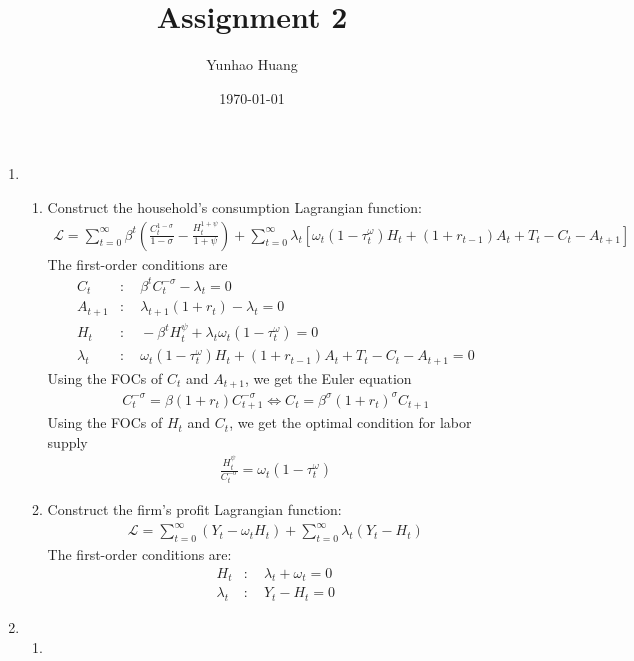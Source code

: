 \documentclass[a4paper,10pt,american]{article}
\begin{document}
\title{Assignment 2}
\author{Yunhao Huang}
\date{\today}

\maketitle

\newcommand\foc[1]{\frac{\partial\mathcal{L}}{\partial{#1}}}


\begin{enumerate}
	\item 
	\begin{enumerate}
		\item 
		Construct the household's consumption Lagrangian function:
		\begin{align*}
		\mathcal{L}=\sum_{t=0}^{\infty} \beta^t \left( \frac{C_t^{1-\sigma}}{1-\sigma}-\frac{H_t^{1+\psi}}{1+\psi}\right) +\sum_{t=0}^{\infty} \lambda_t \left[ {\omega_t(1-\tau_t^\omega)H_t+(1+r_{t-1})A_t+T_t-C_t-A_{t+1}} \right]
		\end{align*}
		The first-order conditions are
		\begin{align*}
			C_t &: \quad \beta^t C_t^{-\sigma} -\lambda_t=0 \\
			A_{t+1} &: \quad \lambda_{t+1}(1+r_t)-\lambda_t=0\\
			H_t &: \quad -\beta^t H_t^\psi +\lambda_t\omega_t(1-\tau_t^\omega)=0\\
			\lambda_t &: \quad \omega_t(1-\tau_t^\omega)H_t+(1+r_{t-1})A_t+T_t-C_t-A_{t+1}=0
		\end{align*}
		Using the FOCs of $C_t$ and $A_{t+1}$, we get the Euler equation
		\begin{align*}
		C_t^{-\sigma}=\beta (1+r_t) C_{t+1}^{-\sigma} \iff C_t=\beta ^\sigma (1+r_t)^\sigma C_{t+1}
		\end{align*}
		Using the FOCs of $H_t$ and $C_t$, we get the optimal condition for labor supply
		\begin{align*}
		\frac{H_t^\psi}{C_t^{-\sigma}}=\omega_t(1-\tau_t^\omega)
		\end{align*}
		
		\item
		Construct the firm's profit Lagrangian function:
		\begin{align*}
		\mathcal{L}=\sum_{t=0}^{\infty} (Y_t-\omega_t H_t) +\sum_{t=0}^{\infty} \lambda_t(Y_t-H_t)
		\end{align*}
		The first-order conditions are:
		\begin{align*}
		H_t &: \quad \lambda_t+\omega_t=0\\
		\lambda_t &: \quad Y_t-H_t=0
		\end{align*}
	\end{enumerate}

	
	\item
	\begin{enumerate}
		\item 
		
	\end{enumerate}
	
	
	
\end{enumerate}
\end{document}
